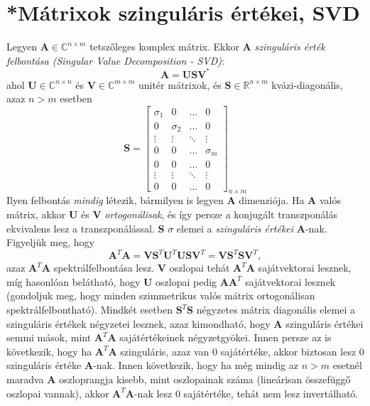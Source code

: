 \documentclass[14p]{report}
\def\pmb{\boldsymbol}
\begin{document}
	\section{*Mátrixok szinguláris értékei, SVD}
	Legyen $\pmb{A} \in \mathbb{C}^{n \times m}$ tetszőleges komplex mátrix. Ekkor $\pmb{A}$ \emph{szinguláris érték felbontása (Singular Value Decomposition - SVD)}:
	\[
		\pmb{A} = \pmb{U}\pmb{S}\pmb{V}^*
	\]
	ahol $\pmb{U} \in \mathbb{C}^{n \times n}$ és $\pmb{V} \in \mathbb{C}^{m \times m}$ unitér mátrixok, és $\pmb{S} \in \mathbb{R}^{n \times m}$ kvázi-diagonális, azaz $n > m$ esetben
	\[
		\pmb{S} =
		\begin{bmatrix}
		\sigma_1 & 0 & \dots & 0 \\
		0 & \sigma_2 & \dots & 0 \\
		\vdots & \vdots & \ddots & \vdots \\
		0 & 0 & \dots & \sigma_m \\
		0 & 0 & \dots & 0 \\
		\vdots & \vdots & \ddots & \vdots \\
		0 & 0 & \dots & 0
		\end{bmatrix}_{n \times m}
	\]
	Ilyen felbontás \emph{mindig} létezik, bármilyen is legyen $\pmb{A}$ dimenziója. Ha $\pmb{A}$ valós mátrix, akkor $\pmb{U}$ és $\pmb{V}$ \emph{ortogonálisak}, és így persze a konjugált transzponálás ekvivalens lesz a transzponálással. $\pmb{S}$ $\sigma$ elemei a \emph{szinguláris értékei} $\pmb{A}$-nak. Figyeljük meg, hogy
	\[
		\pmb{A}^T\pmb{A} = \pmb{V}\pmb{S}^T\pmb{U}^T\pmb{U}\pmb{S}\pmb{V}^T = \pmb{V}\pmb{S}^T\pmb{S}\pmb{V}^T,
	\]
	azaz $\pmb{A}^T\pmb{A}$ spektrálfelbontása lesz. $\pmb{V}$ oszlopai tehát $\pmb{A}^T\pmb{A}$ sajátvektorai lesznek, míg hasonlóan belátható, hogy $\pmb{U}$ oszlopai pedig $\pmb{A}\pmb{A}^T$ sajátvektorai lesznek (gondoljuk meg, hogy minden szimmetrikus valós mátrix ortogonálisan spektrálfelbontható). Mindkét esetben $\pmb{S}^T\pmb{S}$ négyzetes mátrix diagonális elemei a szinguláris értékek négyzetei lesznek, azaz kimondható, hogy $\pmb{A}$ szinguláris értékei semmi mások, mint $\pmb{A}^T\pmb{A}$ sajátértékeinek négyzetgyökei. Innen persze az is következik, hogy ha $\pmb{A}^T\pmb{A}$ szinguláris, azaz van $0$ sajátértéke, akkor biztosan lesz $0$ szinguláris értéke $\pmb{A}$-nak. Innen következik, hogy ha még mindig az $n > m$ esetnél maradva $\pmb{A}$ oszloprangja kisebb, mint oszlopainak száma (lineárisan összefüggő oszlopai vannak), akkor $\pmb{A}^T\pmb{A}$-nak lesz $0$ sajátértéke, tehát nem lesz invertálható.
	\\
\end{document}
